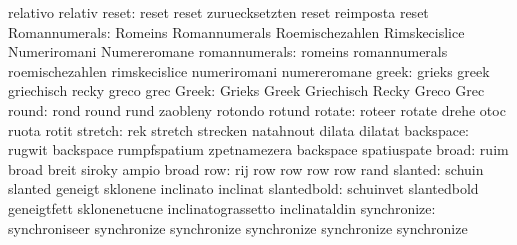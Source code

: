                            relativo                  relativ
                    reset: reset                     reset
                           zuruecksetzten            reset
                           reimposta                 reset
            Romannumerals: Romeins                   Romannumerals
                           Roemischezahlen           Rimskecislice
                           Numeriromani              Numereromane
            romannumerals: romeins                   romannumerals
                           roemischezahlen           rimskecislice
                           numeriromani              numereromane
                    greek: grieks                    greek
                           griechisch                recky
                           greco                     grec
                    Greek: Grieks                    Greek
                           Griechisch                Recky
                           Greco                     Grec
                    round: rond                      round
                           rund                      zaobleny
                           rotondo                   rotund
                   rotate: roteer                    rotate
                           drehe                     otoc
                           ruota                     rotit
                  stretch: rek                       stretch
                           strecken                  natahnout
                           dilata                    dilatat
                backspace: rugwit                    backspace
                           rumpfspatium              zpetnamezera
                           backspace                 spatiuspate %
                    broad: ruim                      broad
                           breit                     siroky
                           ampio                     broad
                      row: rij                       row
                           row                       row
                           row                       rand
                  slanted: schuin                    slanted
                           geneigt                   sklonene
                           inclinato                 inclinat
              slantedbold: schuinvet                 slantedbold
                           geneigtfett               sklonenetucne
                           inclinatograssetto        inclinataldin
              synchronize: synchroniseer             synchronize
                           synchronize               synchronize
                           synchronize               synchronize
